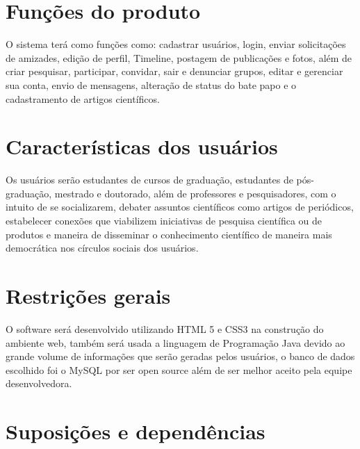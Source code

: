 \section{Funções do produto}

O sistema terá como funções como: cadastrar usuários, login, enviar solicitações de amizades, edição de perfil, Timeline, postagem de publicações e fotos, além de criar pesquisar, participar, convidar, sair e denunciar grupos, editar e gerenciar sua conta, envio de mensagens, alteração de status do bate papo e o cadastramento de artigos científicos.

\section{Características dos usuários}
Os usuários serão estudantes de cursos de graduação, estudantes de pós-graduação, mestrado e doutorado, além de professores e pesquisadores, com o intuito de se socializarem, debater assuntos científicos como artigos de periódicos, estabelecer conexões que viabilizem iniciativas de pesquisa científica ou de produtos e maneira de disseminar o conhecimento científico de maneira mais democrática nos círculos sociais dos usuários.


\section{Restrições gerais}
O software será desenvolvido utilizando HTML 5 e CSS3 na construção do ambiente web, também será usada a linguagem de Programação Java devido ao grande volume de informações que serão geradas pelos usuários, o banco de dados escolhido foi o MySQL por ser open source além de ser melhor aceito pela equipe desenvolvedora.

\section{Suposições e dependências}
